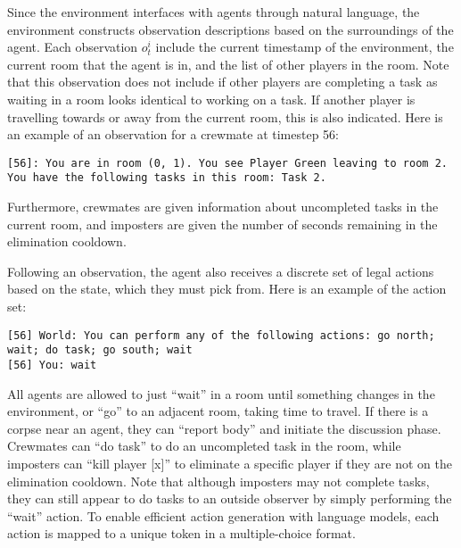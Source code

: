 Since the environment interfaces with agents through natural language, the environment constructs observation descriptions based on the surroundings of the agent. Each observation $o^i_t$ include the current timestamp of the environment, the current room that the agent is in, and the list of other players in the room. Note that this observation does not include if other players are completing a task as waiting in a room looks identical to working on a task. If another player is travelling towards or away from the current room, this is also indicated. Here is an example of an observation for a crewmate at timestep 56: 
\begin{verbatim}
[56]: You are in room (0, 1). You see Player Green leaving to room 2. You have the following tasks in this room: Task 2.
\end{verbatim}

Furthermore, crewmates are given information about uncompleted tasks in the current room, and imposters are given the number of seconds remaining in the elimination cooldown.

Following an observation, the agent also receives a discrete set of legal actions based on the state, which they must pick from. Here is an example of the action set:

\begin{verbatim}
[56] World: You can perform any of the following actions: go north; wait; do task; go south; wait
[56] You: wait
\end{verbatim}



All agents are allowed to just ``wait'' in a room until something changes in the environment, or ``go'' to an adjacent room, taking time to travel. If there is a corpse near an agent, they can ``report body'' and initiate the discussion phase. Crewmates can ``do task'' to do an uncompleted task in the room, while imposters can ``kill player [x]'' to eliminate a specific player if they are not on the elimination cooldown. Note that although imposters may not complete tasks, they can still appear to do tasks to an outside observer by simply performing the ``wait'' action. To enable efficient action generation with language models, each action is mapped to a unique token in a multiple-choice format.%

